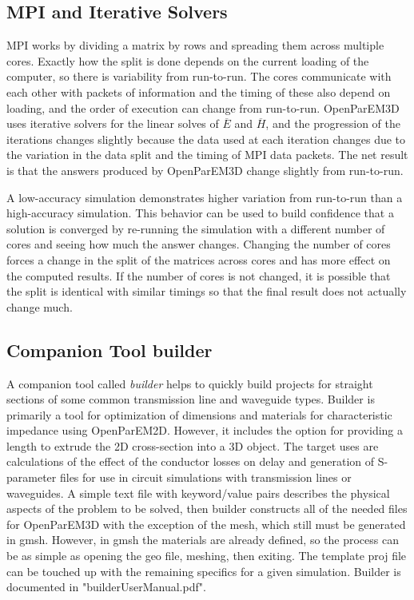 \documentclass[titlepage]{article}
\renewcommand\_{\textunderscore\linebreak[1]}
\begin{document}
\subsection{MPI and Iterative Solvers}

MPI works by dividing a matrix by rows and spreading them across multiple cores.  Exactly how the split is done depends on the current loading of the computer, so there is variability from run-to-run.  The cores communicate with each other with packets of information and the timing of these also depend on loading, and the order of execution can change from run-to-run.  OpenParEM3D uses iterative solvers for the linear solves of $\overline{E}$ and $\overline{H}$, and the progression of the iterations changes slightly because the data used at each iteration changes due to the variation in the data split and the timing of MPI data packets.  The net result is that the answers produced by OpenParEM3D change slightly from run-to-run.

A low-accuracy simulation demonstrates higher variation from run-to-run than a high-accuracy simulation.  This behavior can be used to build confidence that a solution is converged by re-running the simulation with a different number of cores and seeing how much the answer changes.  Changing the number of cores forces a change in the split of the matrices across cores and has more effect on the computed results.  If the number of cores is not changed, it is possible that the split is identical with similar timings so that the final result does not actually change much.

\subsection{Companion Tool builder}

A companion tool called \textit{builder} helps to quickly build projects for straight sections of some common transmission line and waveguide types. Builder is primarily a tool for optimization of dimensions and materials for characteristic impedance using OpenParEM2D.  However, it includes the option for providing a length to extrude the 2D cross-section into a 3D object. The target uses are calculations of the effect of the conductor losses on delay and generation of S-parameter files for use in circuit simulations with transmission lines or waveguides.
A simple text file with keyword/value pairs describes the physical aspects of the problem to be solved, then builder constructs all of the needed files for OpenParEM3D with the exception of the mesh, which still must be generated in gmsh.  However, in gmsh the materials are already defined, so the process can be as simple as opening the geo file, meshing, then exiting.  The template proj file can be touched up with the remaining specifics for a given simulation. Builder is documented in "builder\_User\_Manual.pdf".
\end{document}
